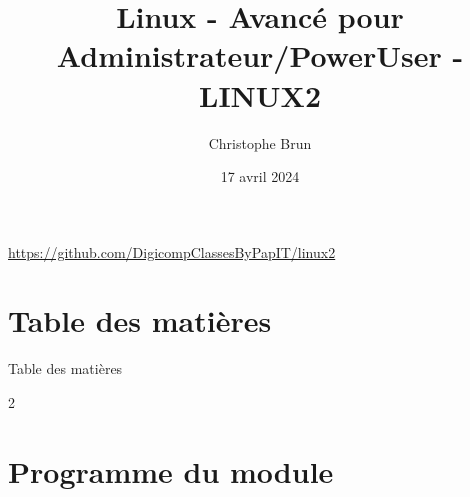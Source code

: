 \documentclass{beamer}
\title[LINUX2]{Linux - Avancé pour Administrateur/PowerUser - LINUX2}
\author{Christophe Brun}
\institute{Digicomp}
\date{17 avril 2024}
\begin{document}
    \begin{frame}
        \titlepage
        \bigbreak
        \centering
        \url{https://github.com/DigicompClassesByPapIT/linux2}
    \end{frame}


    \section{Table des matières}\label{sec:toc}

    \begin{frame}{Table des matières}
        \begin{tiny}
            \begin{multicols}{2}
                \tableofcontents
            \end{multicols}
        \end{tiny}
    \end{frame}


    \section{Programme du module}\label{sec:programme-du-module}
\end{document}
